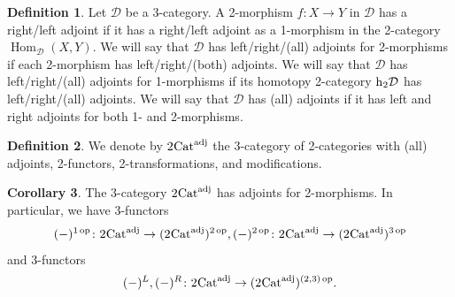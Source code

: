\documentclass{article}
\newcommand{\opp}{\operatorname{op}}%
\newcommand{\Cat}{\operatorname{Cat}}%
\newcommand{\Hom}{\operatorname{Hom}}%
\newcommand{\hh}{\operatorname{h}\hspace{-0.05cm}}%
\newcommand{\D}{\mathcal{D}}
\numberwithin{equation}{section}
\theoremstyle{definition}
\newtheorem{definition}{Definition}[subsection]
\newtheorem{corollary}[definition]{Corollary}
\theoremstyle{theorem}
\begin{document}
\begin{definition}
    Let $\D$ be a 3-category. A 2-morphism $f \colon X \to Y$ in $\D$ has a right/left adjoint if it has a right/left adjoint as a 1-morphism in the 2-category 
    $\Hom_{\D}(X,Y)$. We will say that $\D$ has left/right/(all) adjoints for 2-morphisms if each 2-morphism has left/right/(both) adjoints. We will say that 
    $\D$ has left/right/(all) adjoints for 1-morphisms if its homotopy 2-category $\hh_2 \D$ has left/right/(all) adjoints. We will say that $\D$ has (all) 
    adjoints if it has left and right adjoints for both 1- and 2-morphisms. 
\end{definition}
\begin{definition}
    We denote by $2\hspace{-0.05cm}\Cat^{\operatorname{adj}}$ the 3-category of 2-categories with (all) adjoints, 2-functors, 2-transformations, and modifications.
\end{definition}
\begin{corollary}
    The 3-category $2\hspace{-0.05cm}\Cat^{\operatorname{adj}}$ has adjoints for 2-morphisms. In particular, we have 3-functors 
    \begin{equation}
        (-)^{1\opp} \colon 2\hspace{-0.05cm}\Cat^{\operatorname{adj}} \to (2\hspace{-0.05cm}\Cat^{\operatorname{adj}})^{2\opp}, 
        (-)^{2\opp} \colon 2\hspace{-0.05cm}\Cat^{\operatorname{adj}} \to (2\hspace{-0.05cm}\Cat^{\operatorname{adj}})^{3\opp}
    \end{equation}
    and 3-functors 
    \begin{equation}
        (-)^L, (-)^R \colon 2\hspace{-0.05cm}\Cat^{\operatorname{adj}} \to (2\hspace{-0.05cm}\Cat^{\operatorname{adj}})^{(2,3)\opp}.
    \end{equation}
\end{corollary}
\end{document}
